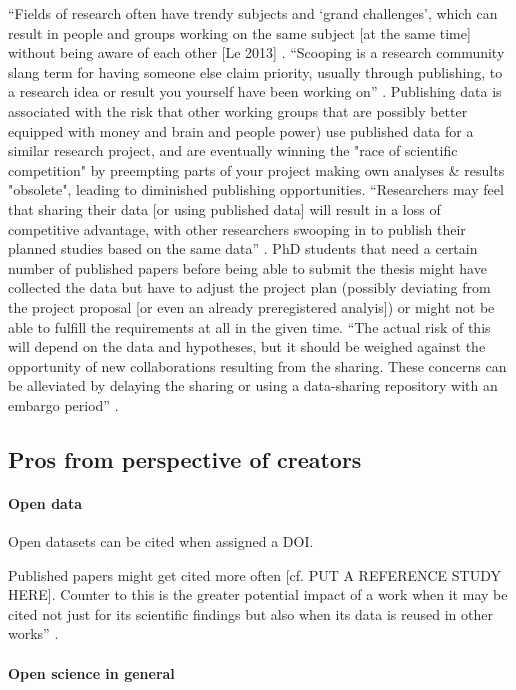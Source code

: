 %
``Fields of research often have trendy subjects and ‘grand challenges’, which
can result in people and groups working on the same subject [at the same time]
without being aware of each other [Le 2013] \citep{laine2017afraid}.
%
``Scooping is a research community slang term for having someone else claim
priority, usually through publishing, to a research idea or result you yourself
have been working on'' \citep{laine2017afraid}.
%
Publishing data is associated with the risk that other working groups that are
possibly better equipped with money and brain and people power) use published
data for a similar research project, and are eventually winning the "race of
scientific competition" by preempting parts of your project making own analyses
\& results "obsolete", leading to diminished publishing opportunities.
%
``Researchers may feel that sharing their data [or using published data] will
result in a loss of competitive advantage, with other researchers swooping in to
publish their planned studies based on the same data'' \citep{nichols2017best}.
%
PhD students that need a certain number of published papers before being able to
submit the thesis might have collected the data but have to adjust the project
plan (possibly deviating from the project proposal [or even an already
preregistered analyis]) or might not be able to fulfill the requirements at all
in the given time.
%
``The actual risk of this will depend on the data and hypotheses, but it should
be weighed against the opportunity of new collaborations resulting from the
sharing. These concerns can be alleviated by delaying the sharing or using a
data-sharing repository with an embargo period'' \citep{nichols2017best}.


\subsection{Pros from perspective of creators}

\paragraph{Open data}
%
Open datasets can be cited when assigned a DOI.

%
Published papers might get cited more often [cf. PUT A REFERENCE STUDY HERE].
%
Counter to this is the greater potential impact of a work when it may be cited
not just for its scientific findings but also when its data is reused in other
works'' \citep{nichols2017best}.


\paragraph{Open science in general}

